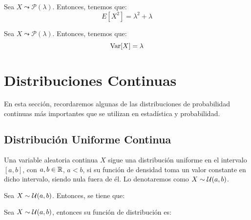 \begin{lema}
    Sea $X\leadsto \mathcal{P}(\lambda)$. Entonces, tenemos que:
    \begin{equation*}
        E[X^2]= \lambda^2+\lambda
    \end{equation*}
\end{lema}

\begin{coro}
    Sea $X\leadsto \mathcal{P}(\lambda)$. Entonces, tenemos que:
    \begin{equation*}
        \operatorname{Var}[X]= \lambda
    \end{equation*}
\end{coro}

\section{Distribuciones Continuas}
\noindent
En esta sección, recordaremos algunas de las distribuciones de probabilidad continuas más importantes que se utilizan en estadística y probabilidad.


\subsection{Distribución Uniforme Continua}

\begin{definicion}
    Una variable aleatoria continua $X$ sigue una distribución uniforme en el intervalo $[a,b]$, con $a,b\in \mathbb{R}$, $a<b$, si su función de densidad
    toma un valor constante en dicho intervalo, siendo nula fuera de él.
    Lo denotaremos como $X\sim \mathcal{U}(a,b)$.
\end{definicion}

\begin{prop}
    Sea $X\sim \mathcal{U}(a,b)$. Entonces, se tiene que:
\end{prop}

\begin{prop}
    Sea $X\sim \mathcal{U}(a,b)$, entonces su función de distribución es:
\end{prop}

